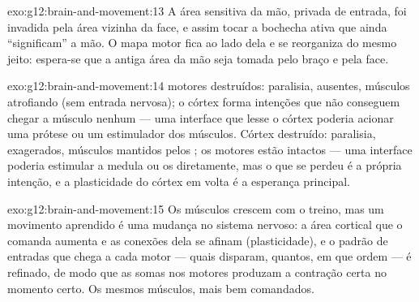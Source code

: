 \begin{solution}{exo:g12:brain-and-movement:13}
A área sensitiva da mão, privada de entrada, foi invadida pela área
vizinha da face, e assim tocar a bochecha ativa  que ainda
``significam'' a mão. O mapa motor fica ao lado dela e se reorganiza do
mesmo jeito: espera-se que a antiga área da mão seja tomada pelo braço
e pela face.
\end{solution}

\begin{solution}{exo:g12:brain-and-movement:14}
 motores destruídos: paralisia,  ausentes, músculos
atrofiando (sem entrada nervosa); o córtex forma intenções que não
conseguem chegar a músculo nenhum --- uma interface que lesse o córtex
poderia acionar uma prótese ou um estimulador dos músculos. Córtex
destruído: paralisia,  exagerados, músculos mantidos pelos
; os  motores estão intactos --- uma interface poderia
estimular a medula ou os  diretamente, mas o que se perdeu é a
própria intenção, e a plasticidade do córtex em volta é a esperança principal.
\end{solution}

\begin{solution}{exo:g12:brain-and-movement:15}
Os músculos crescem com o treino, mas um movimento aprendido é uma
mudança no sistema nervoso: a área cortical que o comanda aumenta e as
conexões dela se afinam (plasticidade), e o padrão de entradas que
chega a cada  motor --- quais disparam, quantos, em que ordem
--- é refinado, de modo que as somas nos  motores produzam a
contração certa no momento certo. Os mesmos músculos, mais bem comandados.
\end{solution}

